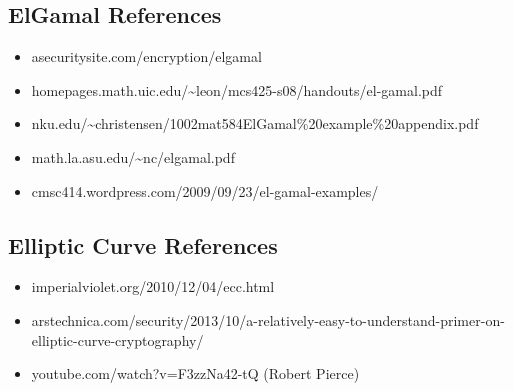 \documentclass[conference]{IEEEtran}
\begin{document}
\subsection{ElGamal References}
\begin{itemize}
\item asecuritysite.com/encryption/elgamal \newline
\item homepages.math.uic.edu/\textasciitilde leon/mcs425-s08/handouts/el-gamal.pdf \newline
\item nku.edu/\textasciitilde christensen/1002mat584ElGamal\%20example\%20appendix.pdf \newline
\item math.la.asu.edu/\textasciitilde nc/elgamal.pdf \newline
\item cmsc414.wordpress.com/2009/09/23/el-gamal-examples/ \newline
\end{itemize}


\subsection{Elliptic Curve References}
\begin{itemize}
\item imperialviolet.org/2010/12/04/ecc.html \newline
\item arstechnica.com/security/2013/10/a-relatively-easy-to-understand-primer-on-elliptic-curve-cryptography/ \newline
\item youtube.com/watch?v=F3zzNa42-tQ (Robert Pierce) \newline
\end{itemize}
\end{document}

